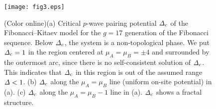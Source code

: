 \documentclass[%
superscriptaddress,
preprint,
amsmath,amssymb,
]{revtex4-1}
\newcommand{\mrm}{\mathrm}
\begin{document}
\begin{figure}[t]
	\centering
	\texttt{[image: fig3.eps]}
	\caption{(Color online)(a) Critical $p$-wave pairing potential ${\it\Delta}_{\mrm{c}}$ of the Fibonacci--Kitaev model for the $g=17$ generation of the Fibonacci sequence. Below ${\it\Delta}_{\mrm{c}}$, the system is a non-topological phase.
		We put ${\it\Delta}_{\mrm{c}}=1$ in the region centered at $\mu_A=\mu_B=\pm 4$ and surrounded by the outermost arc, since there is no self-consistent solution of ${\it\Delta}_{\mrm{c}}$. This indicates that ${\it\Delta}_{\mrm{c}}$ in this region is out of the assumed range ${\it\Delta}<1$.
		(b) ${\it\Delta}_{\mrm{c}}$ along the $\mu_A=\mu_B$ line (uniform on-site potential) in (a).  
		(c) ${\it\Delta}_{\mrm{c}}$ along the $\mu_A=\mu_B-1$ line in (a). ${\it\Delta}_{\mrm{c}}$ shows a fractal structure.}
	\label{fig:cp}
\end{figure}
\end{document}

